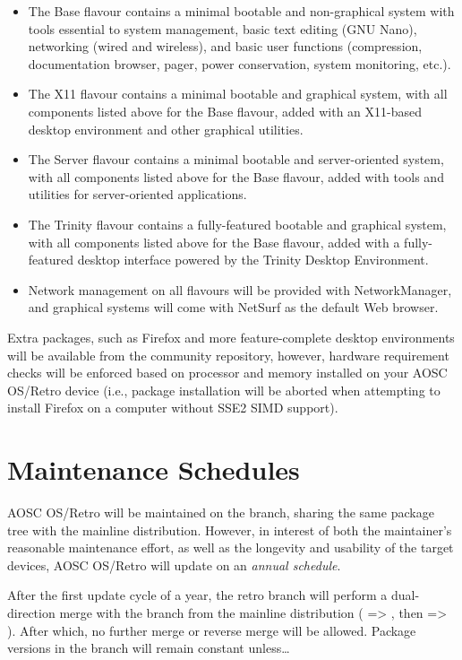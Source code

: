     \begin{itemize}
        \item The Base flavour contains a minimal bootable and non-graphical system with tools essential to system management, basic text editing (GNU Nano), networking (wired and wireless), and basic user functions (compression, documentation browser, pager, power conservation, system monitoring, etc.).
        \item The X11 flavour contains a minimal bootable and graphical system, with all components listed above for the Base flavour, added with an X11-based desktop environment and other graphical utilities.
        \item The Server flavour contains a minimal bootable and server-oriented system, with all components listed above for the Base flavour, added with tools and utilities for server-oriented applications.
        \item The Trinity flavour contains a fully-featured bootable and graphical system, with all components listed above for the Base flavour, added with a fully-featured desktop interface powered by the Trinity Desktop Environment.
        \item Network management on all flavours will be provided with NetworkManager, and graphical systems will come with NetSurf as the default Web browser.
    \end{itemize}

    Extra packages, such as Firefox and more feature-complete desktop environments will be available from the community repository, however, hardware requirement checks will be enforced based on processor and memory installed on your AOSC OS/Retro device (i.e., package installation will be aborted when attempting to install Firefox on a computer without SSE2 SIMD support).

    \section{Maintenance Schedules}

    AOSC OS/Retro will be maintained on the  branch,
    sharing the same package tree with the mainline distribution.
    However, in interest of both the maintainer's reasonable maintenance effort,
    as well as the longevity and usability of the target devices,
    AOSC OS/Retro will update on an \textit{annual schedule}.

    After the first update cycle of a year, the retro branch will perform a dual-direction
    merge with the  branch from the mainline distribution ( => , then  => ).
    After which, no further merge or reverse merge will be allowed.
    Package versions in the  branch will remain constant unless\ldots

